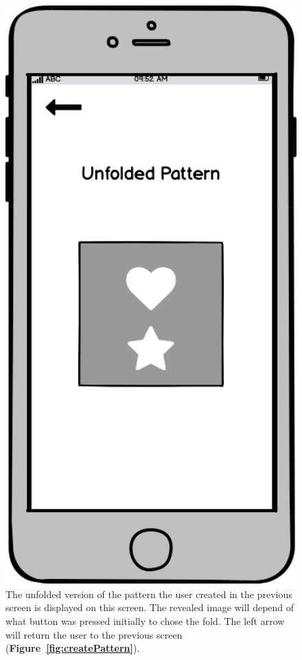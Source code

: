 \documentclass[11pt]{article}
\begin{document}
            \begin{figure}
                \begin{minipage}[c]{0.65\textwidth}
                \caption{The unfolded version of the pattern the user created in the previous screen is displayed on this screen. The revealed image will depend of what button was pressed initially to chose the fold. The left arrow will return the user to the previous screen (\textbf{Figure~\ref{fig:createPattern}}).}
                \label{fig:reveal}
                \end{minipage}\hfill
                \begin{minipage}[c]{0.35\textwidth}
                \includegraphics[width=1\textwidth]{Images/Prototype/prototypeReveal}
                \end{minipage}
            \end{figure}
            
\end{document}
